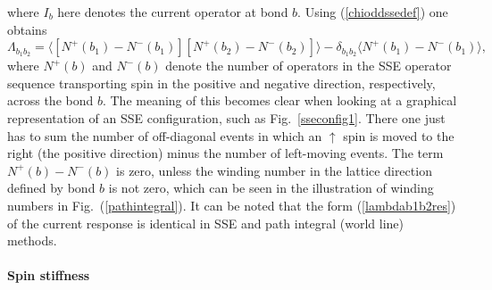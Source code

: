 \documentclass[draft,numberedheadings]{aipproc}
\begin{document}
where $I_{b}$ here denotes the current operator at bond $b$. Using (\ref{chioddssedef}) one obtains
\begin{equation}
\Lambda_{b_1b_2} = \langle [N^+(b_1)-N^-(b_1)][N^+(b_2)-N^-(b_2)]\rangle - \delta_{b_1b_2}\langle N^+(b_1)-N^-(b_1)\rangle,
\label{lambdab1b2res}
\end{equation}
where $N^+(b)$ and $N^-(b)$ denote the number of operators in the SSE operator sequence transporting spin in the positive and negative direction, 
respectively, across the bond $b$. The meaning of this becomes clear when looking at a graphical representation of an SSE configuration, such as 
Fig.~\ref{sseconfig1}. There one just has to sum the number of off-diagonal events in which an $\uparrow$ spin is moved to the right 
(the positive direction) minus the number of left-moving events. The term $N^+(b)-N^-(b)$ is zero, unless the winding number in the lattice
direction defined by bond $b$ is not zero, which can be seen in the illustration of winding numbers in Fig.~(\ref{pathintegral}). It can be noted
that the form (\ref{lambdab1b2res}) of the current response is identical in SSE and path integral (world line) methods.

\paragraph{Spin stiffness}
\end{document}
